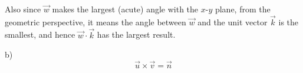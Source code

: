 \documentclass{article}
\begin{document}
Also since $\vec{w}$ makes the largest (acute) angle with the $x$-$y$ plane, 
from the geometric perspective, it means the angle between $\vec{w}$ and the 
unit vector $\vec{k}$ is the smallest, and hence $\vec{w} \cdot \vec{k}$ has the 
largest result.

b)
\begin{equation*}
  \vec{u} \times \vec{v} = \vec{n}
\end{equation*}
\end{document}
